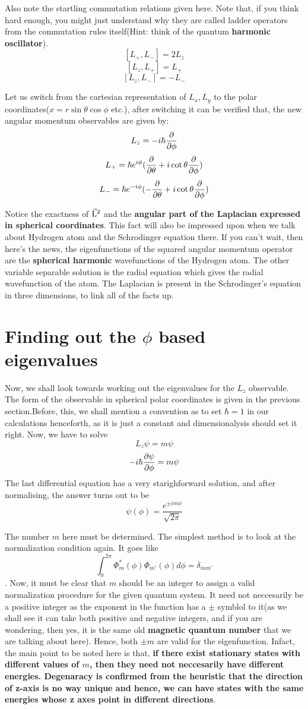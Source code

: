 \documentclass[12pt]{article}
\begin{document}
Also note the startling commutation relations given here. Note that, if you think hard enough, you might just understand why they are called ladder operators from the commutation rules itself(Hint: think of the quantum \textbf{harmonic oscillator}). 
$$[L_+, L_-] = 2L_z$$
$$[L_z, L_+] = L_+$$
$$[L_z, L_-] = -L_-$$
 
Let us switch from the cartesian representation of $L_x, L_y$ to the polar coordinates($x=r\sin\theta\cos\phi$ etc.), after switching it can be verified that, the new angular momentum observables are given by:
$$L_z = -i\hbar\frac{\partial{}}{\partial{\phi}}$$
$$L_+ = \hbar e^{i\phi}(\frac{\partial{}}{\partial{\theta}} + i\cot\theta\frac{\partial{}}{\partial{\phi}})$$
$$L_- = \hbar e^{-i\phi}(-\frac{\partial{}}{\partial{\theta}} + i\cot\theta\frac{\partial{}}{\partial{\phi}})$$

Notice the exactness of \textbf{$\vec{\mathrm{L}}^2$} and the \textbf{angular part of the Laplacian expressed in spherical coordinates}. This fact will also be impressed upon when we talk about Hydrogen atom and the Schrodinger equation there. If you can't wait, then here's the news, the eigenfunctions of the squared angular momentum operator are the \textbf{spherical harmonic} wavefunctions of the Hydrogen atom. The other variable separable solution is the radial equation which gives the radial wavefunction of the atom. The Laplacian is present in the Schrodinger's equation in three dimensions, to link all of the facts up.

\section{Finding out the $\phi$ based eigenvalues}
Now, we shall look towards working out the eigenvalues for the $L_z$ observable. The form of the observable in spherical polar coordinates is given in the previous section.Before, this, we shall mention a convention as to set $\hbar = 1$ in our calculations henceforth, as it is just a constant and dimensionalysis should set it right. Now, we have to solve $$L_z\psi = m\psi$$ $$-i\hbar\frac{\partial{\psi}}{\partial{\phi}} = m\psi$$ The last differential equation has a very starighforward solution, and after normalising, the answer turns out to be 
$$\psi(\phi) = \frac{e^{\pm im\phi}}{\sqrt {2\pi}}$$
 
The number $m$ here must be determined. The simplest method is to look at the normalization condition again. It goes like $$\int_0^{2\pi} \Phi_m^*(\phi)\Phi_{m'}(\phi) d\phi = \delta_{mm'}$$. Now, it must be clear that $m$ should be an integer to assign a valid normalization procedure for the given quantum system. It need not neccesarily be a positive integer as the exponent in the function has a $\pm$ symblol to it(as we shall see it can take both positive and negative integers, and if you are wondering, then yes, it is the same old \textbf{magnetic quantum number} that we are talking about here). Hence, both $\pm m$ are valid for the eigenfunction. Infact, the main point to be noted here is that, \textbf{if there exist stationary states with different values of $m$, then they need not neccesarily have different energies. Degenaracy is confirmed from the heuristic that the direction of z-axis is no way unique and hence, we can have states with the same energies whose z axes point in different directions}.
\end{document}
